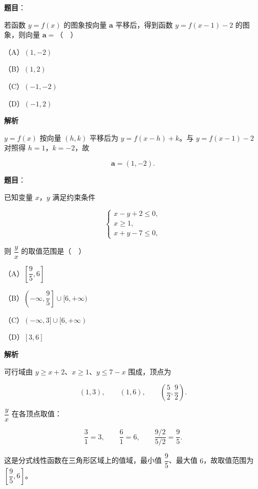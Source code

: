 \begin{answer}

\textbf{题目}：

若函数 $y=f(x)$ 的图象按向量 $\boldsymbol a$ 平移后，得到函数 $y=f(x-1)-2$ 的图象，则向量 $\boldsymbol a=$（　）

（A）$(1,-2)$

（B）$(1,2)$

（C）$(-1,-2)$

（D）$(-1,2)$

\textbf{解析}

$y=f(x)$ 按向量 $(h,k)$ 平移后为 $y=f(x-h)+k$。与 $y=f(x-1)-2$ 对照得 $h=1$，$k=-2$，故

\nopagebreak[4]
\[\boldsymbol a=(1,-2).\]


\end{answer}
\begin{answer}

\textbf{题目}：

已知变量 $x$，$y$ 满足约束条件

\nopagebreak[4]
\[\begin{cases}x-y+2\leqslant0,\\ x\geqslant1,\\ x+y-7\leqslant0,\end{cases}\]

则 $\dfrac yx$ 的取值范围是（　）

（A）$\left[\dfrac95,6\right]$

（B）$\left(-\infty,\dfrac95\right]\cup[6,+\infty)$

（C）$(-\infty,3]\cup[6,+\infty)$

（D）$[3,6]$

\textbf{解析}

可行域由 $y\geqslant x+2$、$x\geqslant1$、$y\leqslant7-x$ 围成，顶点为

\nopagebreak[4]
\[(1,3),\qquad (1,6),\qquad \left(\frac52,\frac92\right).\]

$\dfrac yx$ 在各顶点取值：

\nopagebreak[4]
\[\frac31=3,\qquad \frac61=6,\qquad \frac{9/2}{5/2}=\frac95.\]

这是分式线性函数在三角形区域上的值域，最小值 $\dfrac95$、最大值 $6$，故取值范围为 $\left[\dfrac95,6\right]$。


\end{answer}
